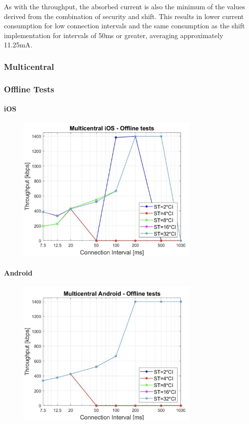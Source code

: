 \documentclass{Configuration_Files/PoliMi3i_thesis}
\begin{document}
As with the throughput, the absorbed current is also the minimum of the values derived from the combination of security and shift. This results in lower current consumption for low connection intervals and the same consumption as the shift implementation for intervals of 50ms or greater, averaging approximately 11.25mA.

\subsubsection*{Multicentral}
\subsubsection*{Offline Tests}
\paragraph{iOS}

\begin{figure}[h!]
    \centering
    \includegraphics[width=0.8\textwidth]{Results Manuel/figure25}
    \label{fig:figure1}
\end{figure}

\paragraph{Android}

\begin{figure}[h!]
    \centering
    \includegraphics[width=0.8\textwidth]{Results Manuel/figure26}
    \label{fig:figure1}
\end{figure}
\end{document}
